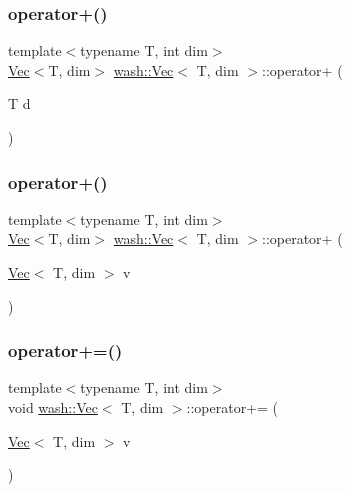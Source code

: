 \mbox{\label{classwash_1_1Vec_ad8a8863138b26c2b2eae41e11f40e78f}} 
\subsubsection{\texorpdfstring{operator+()}{operator+()}\hspace{0.1cm}{\footnotesize\ttfamily [1/2]}}
{\footnotesize\ttfamily template$<$typename T, int dim$>$ \\
\mbox{\hyperlink{classwash_1_1Vec}{Vec}}$<$T, dim$>$ \mbox{\hyperlink{classwash_1_1Vec}{wash\+::\+Vec}}$<$ T, dim $>$\+::operator+ (\begin{DoxyParamCaption}\item[{T}]{d }\end{DoxyParamCaption})\hspace{0.3cm}{\ttfamily [inline]}}

\mbox{\label{classwash_1_1Vec_a951a842c43b3cf99d60abfe73e53475c}} 
\subsubsection{\texorpdfstring{operator+()}{operator+()}\hspace{0.1cm}{\footnotesize\ttfamily [2/2]}}
{\footnotesize\ttfamily template$<$typename T, int dim$>$ \\
\mbox{\hyperlink{classwash_1_1Vec}{Vec}}$<$T, dim$>$ \mbox{\hyperlink{classwash_1_1Vec}{wash\+::\+Vec}}$<$ T, dim $>$\+::operator+ (\begin{DoxyParamCaption}\item[{\mbox{\hyperlink{classwash_1_1Vec}{Vec}}$<$ T, dim $>$}]{v }\end{DoxyParamCaption})\hspace{0.3cm}{\ttfamily [inline]}}

\mbox{\label{classwash_1_1Vec_ac92d90da0a36cdd6b38a8a12e341fa84}} 
\subsubsection{\texorpdfstring{operator+=()}{operator+=()}}
{\footnotesize\ttfamily template$<$typename T, int dim$>$ \\
void \mbox{\hyperlink{classwash_1_1Vec}{wash\+::\+Vec}}$<$ T, dim $>$\+::operator+= (\begin{DoxyParamCaption}\item[{\mbox{\hyperlink{classwash_1_1Vec}{Vec}}$<$ T, dim $>$}]{v }\end{DoxyParamCaption})\hspace{0.3cm}{\ttfamily [inline]}}

